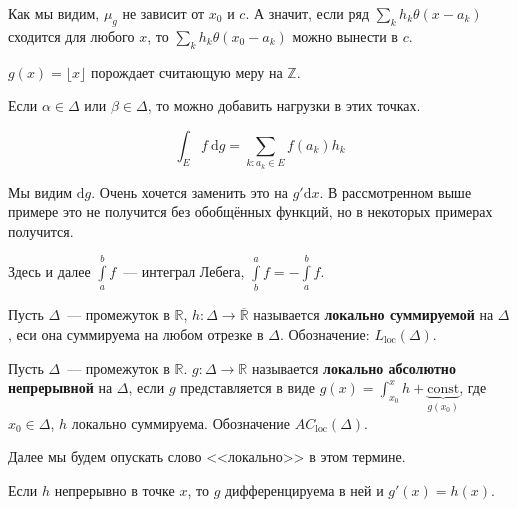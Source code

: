 \documentclass{article}
\begin{document}
    \begin{remark}
        Как мы видим, $\mu_g$ не зависит от $x_0$ и $c$. А значит, если ряд $\sum\limits_kh_k \theta(x-a_k)$ сходится для любого $x$, то $\sum\limits_kh_k \theta(x_0-a_k)$ можно вынести в $c$.
    \end{remark}
    \begin{example}
        $g(x)=\lfloor x\rfloor$ порождает считающую меру на $\mathbb Z$.
    \end{example}
    \begin{remark}
        Если $\alpha\in\Delta$ или $\beta\in\Delta$, то можно добавить нагрузки в этих точках.
    \end{remark}
    \begin{corollary}
        $$
        \int_Ef~\mathrm dg=\sum\limits_{k:a_k\in E}f(a_k)h_k
        $$
    \end{corollary}
    \begin{remark}
        Мы видим $\mathrm dg$. Очень хочется заменить это на $g'\mathrm dx$. В рассмотренном выше примере это не получится без обобщённых функций, но в некоторых примерах получится.
    \end{remark}
    \begin{remark}
        Здесь и далее $\int\limits_a^bf$~--- интеграл Лебега, $\int\limits_b^af=-\int\limits_a^bf$.
    \end{remark}
    \begin{definition}
        Пусть $\Delta$~--- промежуток в $\mathbb R$, $h\colon\Delta\to\overline{\mathbb R}$ называется \textbf{локально суммируемой} на $\Delta$, еси она суммируема на любом отрезке в $\Delta$. Обозначение: $L_{\mathrm{loc}}(\Delta)$.
    \end{definition}
    \begin{definition}
        Пусть $\Delta$~--- промежуток в $\mathbb R$. $g\colon\Delta\to\mathbb R$ называется \textbf{локально абсолютно непрерывной} на $\Delta$, если $g$ представляется в виде $g(x)=\int_{x_0}^xh+\underbrace{\mathrm{const}}_{g(x_0)}$, где $x_0\in\Delta$, $h$ локально суммируема. Обозначение $AC_{\mathrm{loc}}(\Delta)$.
    \end{definition}
    \begin{remark}
        Далее мы будем опускать слово <<локально>> в этом термине.
    \end{remark}
    \begin{property}
        Если $h$ непрерывно в точке $x$, то $g$ дифференцируема в ней и $g'(x)=h(x)$.
    \end{property}
\end{document}
